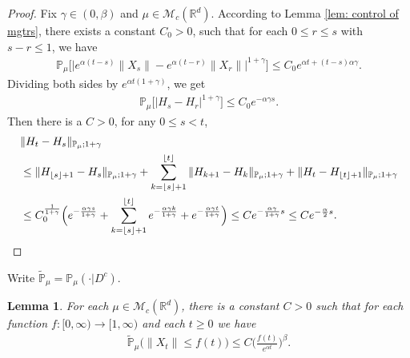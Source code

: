 \documentclass[12pt]{amsart}
\theoremstyle{plain}
\newtheorem{lem}[thm]{Lemma}
\theoremstyle{definition}
\numberwithin{equation}{section}
\begin{document}
\begin{proof}
     Fix $\gamma \in (0,\beta)$ and $\mu\in \mathcal M_c(\mathbb R^d)$.
 According to Lemma \ref{lem: control of mgtrs}, there exists a constant $C_0>0$, such that for each $0\leq r\leq s $ with $s-r\leq1$, we have
    \begin{align}
        \mathbb{P}_{\mu}\big[\big|e^{\alpha(t-s)}\|X_s\|-e^{\alpha(t-r)}\|X_r\|\big|^{1+\gamma}\big]
        \leq C_0e^{\alpha t+(t-s)\alpha\gamma}.
    \end{align}
    Dividing both sides by $e^{\alpha t(1+\gamma)}$, we get
    \begin{align}
        \mathbb{P}_{\mu}\big[|H_s-H_r|^{1+\gamma}\big]\leq  C_0 e^{-\alpha \gamma s}.
    \end{align}
    Then there is a $C>0$, for any $0\leq s<t$,
\begin{align}
	& \|H_t-H_s\|_{\mathbb{P}_{\mu};1+\gamma}
	\\&\leq \|H_{\lfloor s \rfloor+1}-H_s\|_{\mathbb{P}_{\mu};1+\gamma}+\sum_{k=\lfloor s \rfloor+1}^{\lfloor t \rfloor}\|H_{k+1}-H_{k}\|_{\mathbb{P}_{\mu};1+\gamma}+\|H_t-H_{\lfloor t \rfloor+1}\|_{\mathbb{P}_{\mu};1+\gamma}
	\\& \leq C_0^{\frac{1}{1+\gamma}} \Big(e^{-\frac{\alpha \gamma s}{1+\gamma}}+\sum_{k=\lfloor s \rfloor+1}^{\lfloor t \rfloor}e^{-\frac{\alpha \gamma k}{1+\gamma}}+ e^{-\frac{\alpha \gamma t}{1+\gamma}}\Big)
	\leq Ce^{-\frac{\alpha \gamma}{1+\gamma}s}\leq Ce^{-\frac{\alpha}{2}s}.
    \qedhere
\end{align}	
\end{proof}

Write $\mathbb{\tilde{P}}_{\mu}=\mathbb{P}_{\mu}(\cdot|D^c)$.
\begin{lem}
\label{lem: control of XT}
	For each $\mu\in \mathcal M_c(\mathbb R^d)$, there is a constant $C>0$ such that for each function $f:[0,\infty)\to [1,\infty)$ and each $t\geq 0$ we have
\begin{align}
    \mathbb{\tilde{P}}_{\mu}\big(\|X_t\|\leq f(t)\big)\leq C \Big(\frac{f(t)}{e^{\alpha t}}\Big)^{\beta}.
\end{align}
\end{lem}
\end{document}
